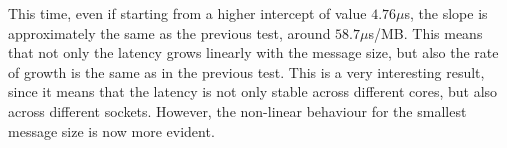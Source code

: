 \begin{figure}[H]
{
        }
    \end{figure}
    This time, even if starting from a higher intercept of value
    $4.76 \mu$s, the slope is approximately the same as the previous
    test, around $58.7 \mu$s/MB. This means that not only the latency
    grows linearly with the message size, but also the rate of growth
    is the same as in the previous test. This is a very interesting
    result, since it means that the latency is not only stable across
    different cores, but also across different sockets. However, the
    non-linear behaviour for the smallest message size is now more evident.

